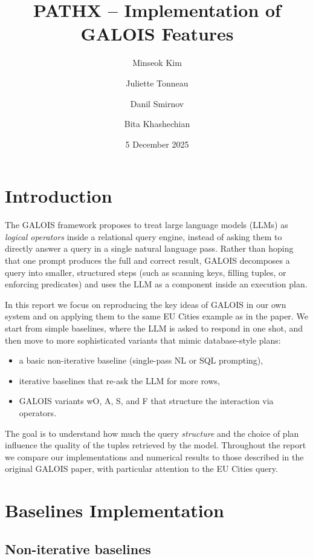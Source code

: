 \documentclass[11pt]{article}
\title{PATHX -- Implementation of GALOIS Features}
\author{Minseok Kim \and Juliette Tonneau \and Danil Smirnov \and Bita Khashechian}
\date{5 December 2025}
\begin{document}
\maketitle

\tableofcontents

\section{Introduction}

The GALOIS framework proposes to treat large language models (LLMs) as
\emph{logical operators} inside a relational query engine, instead of asking them to
directly answer a query in a single natural language pass. Rather than hoping that one
prompt produces the full and correct result, GALOIS decomposes a query into smaller,
structured steps (such as scanning keys, filling tuples, or enforcing predicates) and uses
the LLM as a component inside an execution plan.

In this report we focus on reproducing the key ideas of GALOIS in our own system
and on applying them to the same EU Cities example as in the paper. We start from
simple baselines, where the LLM is asked to respond in one shot, and then move to
more sophisticated variants that mimic database-style plans:

\begin{itemize}
  \item a basic non-iterative baseline (single-pass NL or SQL prompting),
  \item iterative baselines that re-ask the LLM for more rows,
  \item GALOIS variants wO, A, S, and F that structure the interaction via operators.
\end{itemize}

The goal is to understand how much the query \emph{structure} and the choice of plan
influence the quality of the tuples retrieved by the model. Throughout the report we
compare our implementations and numerical results to those described in the original
GALOIS paper, with particular attention to the EU Cities query.

\section{Baselines Implementation}
\label{sec:baselines}

\subsection{Non-iterative baselines}
\end{document}
